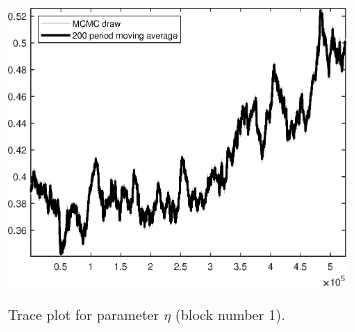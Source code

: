 \begin{figure}[H]
\centering
  \includegraphics[width=0.8\textwidth]{BRS_growth_KPR/graphs/TracePlot_eta_blck_1}\\
    \caption{Trace plot for parameter ${\eta}$ (block number 1).}
\end{figure}

